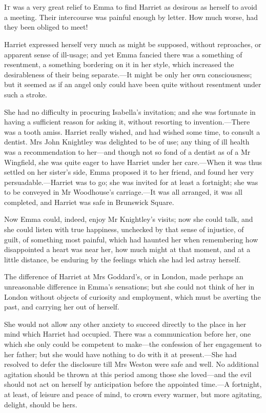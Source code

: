 \chapter[Chapter \thechapter]{}
\lettrine[lraise=0.3]{I}{t} was a very great relief to Emma to find Harriet as desirous as herself to avoid a meeting. Their intercourse was painful enough by letter. How much worse, had they been obliged to meet!

\zz
Harriet expressed herself very much as might be supposed, without reproaches, or apparent sense of ill-usage; and yet Emma fancied there was a something of resentment, a something bordering on it in her style, which increased the desirableness of their being separate.—It might be only her own consciousness; but it seemed as if an angel only could have been quite without resentment under such a stroke.

She had no difficulty in procuring Isabella's invitation; and she was fortunate in having a sufficient reason for asking it, without resorting to invention.—There was a tooth amiss. Harriet really wished, and had wished some time, to consult a dentist. Mrs John Knightley was delighted to be of use; any thing of ill health was a recommendation to her—and though not so fond of a dentist as of a Mr Wingfield, she was quite eager to have Harriet under her care.—When it was thus settled on her sister's side, Emma proposed it to her friend, and found her very persuadable.—Harriet was to go; she was invited for at least a fortnight; she was to be conveyed in Mr Woodhouse's carriage.—It was all arranged, it was all completed, and Harriet was safe in Brunswick Square.

Now Emma could, indeed, enjoy Mr Knightley's visits; now she could talk, and she could listen with true happiness, unchecked by that sense of injustice, of guilt, of something most painful, which had haunted her when remembering how disappointed a heart was near her, how much might at that moment, and at a little distance, be enduring by the feelings which she had led astray herself.

The difference of Harriet at Mrs Goddard's, or in London, made perhaps an unreasonable difference in Emma's sensations; but she could not think of her in London without objects of curiosity and employment, which must be averting the past, and carrying her out of herself.

She would not allow any other anxiety to succeed directly to the place in her mind which Harriet had occupied. There was a communication before her, one which she only could be competent to make—the confession of her engagement to her father; but she would have nothing to do with it at present.—She had resolved to defer the disclosure till Mrs Weston were safe and well. No additional agitation should be thrown at this period among those she loved—and the evil should not act on herself by anticipation before the appointed time.—A fortnight, at least, of leisure and peace of mind, to crown every warmer, but more agitating, delight, should be hers.

